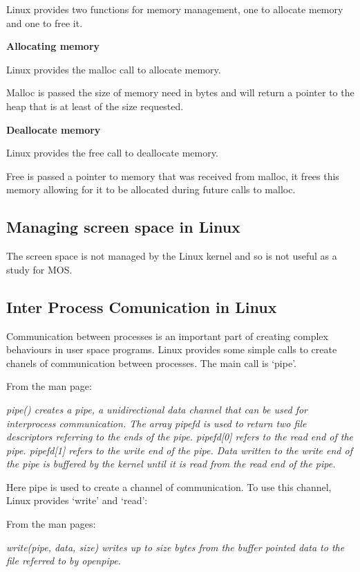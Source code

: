 \documentclass[a4paper]{report}
\begin{document}
Linux provides two functions for memory management, one to allocate memory and one to free it.

\noindent
\textbf{Allocating memory}

Linux provides the malloc call to allocate memory.

Malloc is passed the size of memory need in bytes and will return a pointer to the heap that is at least of the size requested.

\noindent
\textbf{Deallocate memory}

Linux provides the free call to deallocate memory.

Free is passed a pointer to memory that was received from malloc, it frees this memory allowing for it to be allocated during future calls to malloc.


\subsection{Managing screen space in Linux}

The screen space is not managed by the Linux kernel and so is not useful as a study for MOS.

\subsection{Inter Process Comunication in Linux}

Communication between processes is an important part of creating complex behaviours in user space programs. Linux provides some simple calls to create chanels of communication between processes. The main call is `pipe'.

From the man page:

\textit{pipe() creates a pipe, a unidirectional data channel that can be used for interprocess communication. The array pipefd is used to return two file descriptors referring to the ends of the pipe. pipefd[0] refers to the read end of the pipe. pipefd[1] refers to the write end of the pipe. Data written to the write end of the pipe is buffered by the kernel until it is read from the read end of the pipe.} \cite{manPipe}

Here pipe is used to create a channel of communication. To use this channel, Linux provides `write' and `read':

From the man pages:

\textit{write(pipe, data, size) writes up to size bytes from the buffer pointed data to the file referred to by openpipe.} \cite{manWrite}
\end{document}
